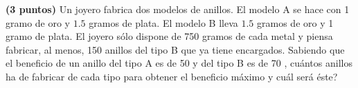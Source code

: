 
\textbf{(3 puntos)} Un joyero fabrica dos modelos de anillos. El modelo A se hace con 1 gramo de oro y $1.5$ gramos de plata. El modelo B lleva $1.5$ gramos de oro y 1 gramo de plata. El joyero sólo dispone de 750 gramos de cada metal y piensa fabricar, al menos, 150 anillos del tipo B que ya tiene encargados. Sabiendo que el beneficio de un anillo del tipo A es de 50 \texteuro{} y del tipo B es de 70 \texteuro{}, \textquestiondown{}cuántos anillos ha de fabricar de cada tipo para obtener el beneficio máximo y cuál será éste?
